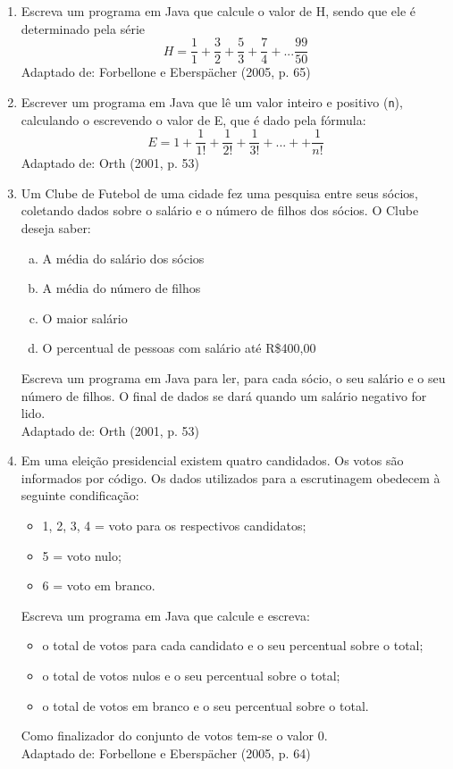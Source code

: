 \documentclass[onecolumn,a4paper,10pt]{report}
\newcommand{\+}{\, + \,}
\newcommand{\<}{\hspace*{-0.4cm}}
\begin{document}
\begin{enumerate}[1.]
\item Escreva um programa em Java que calcule o valor de H, sendo que ele é determinado pela série
\[ H = \frac{1}{1} + \frac{3}{2} + \frac{5}{3} + \frac{7}{4} + ... \frac{99}{50} \]
{\tiny Adaptado de: Forbellone e Eberspächer (2005, p. 65)}

\item Escrever um programa em Java que lê um valor inteiro e positivo (\texttt{n}), calculando o escrevendo o valor de E, que é dado pela fórmula:
\[ E = 1 + \frac{1}{1!} + \frac{1}{2!}+ \frac{1}{3!} + ... + + \frac{1}{n!}\]
{\tiny Adaptado de: Orth (2001, p. 53)}

\item Um Clube de Futebol de uma cidade fez uma pesquisa entre seus sócios, coletando dados sobre o salário e o número de filhos dos sócios. O Clube deseja saber:
\begin{enumerate}[a)]
	\item A média do salário dos sócios
	\item A média do número de filhos
	\item O maior salário
	\item O percentual de pessoas com salário até R\$400,00
\end{enumerate}
Escreva um programa em Java para ler, para cada sócio, o seu salário e o seu número de filhos. O final de dados se dará quando um salário negativo for lido.\\
{\tiny Adaptado de: Orth (2001, p. 53)}

\item Em uma eleição presidencial existem quatro candidados. Os votos são informados por código. Os dados utilizados para a escrutinagem obedecem à seguinte condificação:
\begin{itemize}
	\item 1, 2, 3, 4 = voto para os respectivos candidatos;
	\item 5 = voto nulo;
	\item 6 = voto em branco.
\end{itemize}
Escreva um programa em Java que calcule e escreva:
\begin{itemize}
	\item o total de votos para cada candidato e o seu percentual sobre o total;
	\item o total de votos nulos e o seu percentual sobre o total;
	\item o total de votos em branco e o seu percentual sobre o total.
\end{itemize}
Como finalizador do conjunto de votos tem-se o valor 0.\\
{\tiny Adaptado de: Forbellone e Eberspächer (2005, p. 64)}


\end{enumerate}
\end{document}
